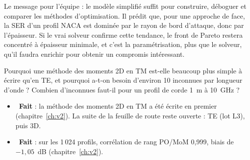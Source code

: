 \begin{projet}
Le message pour l'équipe : le modèle simplifié suffit pour construire, déboguer et comparer les méthodes d'optimisation. Il prédit que, pour une approche de face, la SER d'un profil NACA est dominée par le rayon de bord d'attaque, donc par l'épaisseur. Si le vrai solveur confirme cette tendance, le front de Pareto restera concentré à épaisseur minimale, et c'est la paramétrisation, plus que le solveur, qu'il faudra enrichir pour obtenir un compromis intéressant.
\end{projet}

\exercices
\begin{exercice}
Pourquoi une méthode des moments 2D en TM est-elle beaucoup plus simple à écrire qu'en TE, et pourquoi a-t-on besoin d'environ 10 inconnues par longueur d'onde ? Combien d'inconnues faut-il pour un profil de corde 1~m à 10~GHz ?
\end{exercice}

\begin{pistes}
\begin{itemize}
\item {}~\textbf{Fait} : la méthode des moments 2D en TM a été écrite en premier (chapitre~\ref{ch:v2}). La suite de la feuille de route reste ouverte : TE (lot L3), puis 3D.
\item {}~\textbf{Fait} : sur les 1\,024 profils, corrélation de rang PO/MoM 0,999, biais de $-1{,}05$~dB (chapitre~\ref{ch:v2}).
\end{itemize}
\end{pistes}
